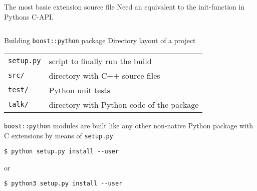 
\begin{frame}[fragile]{The most basic extension source file}
Need an equivalent to the init-function in Pythons C-API.

\inputminted[fontsize=\tiny,linenos,
             firstline=20,
             lastline=42]{cpp}{../src/python-talk/src/functions.cpp}

\end{frame}

\begin{frame}[fragile]{Building \texttt{boost::python} package}
    Directory layout of a project
    \begin{center}
        \begin{tabular}{ll}
            \texttt{setup.py} & script to finally run the build \\
            \texttt{src/}     & directory with C++ source files \\
            \texttt{test/}    & Python unit tests \\
            \texttt{talk/}    & directory with Python code of the package \\
        \end{tabular}
    \end{center}
    \vspace{0.05\textheight}
    \texttt{boost::python} modules are built like any other non-native 
    Python package with C extensions by means of \texttt{setup.py}
    \vspace{0.05\textheight}
    \begin{verbatim}
$ python setup.py install --user 
    \end{verbatim}
    or 
    \begin{verbatim}
$ python3 setup.py install --user
    \end{verbatim}
\end{frame}


